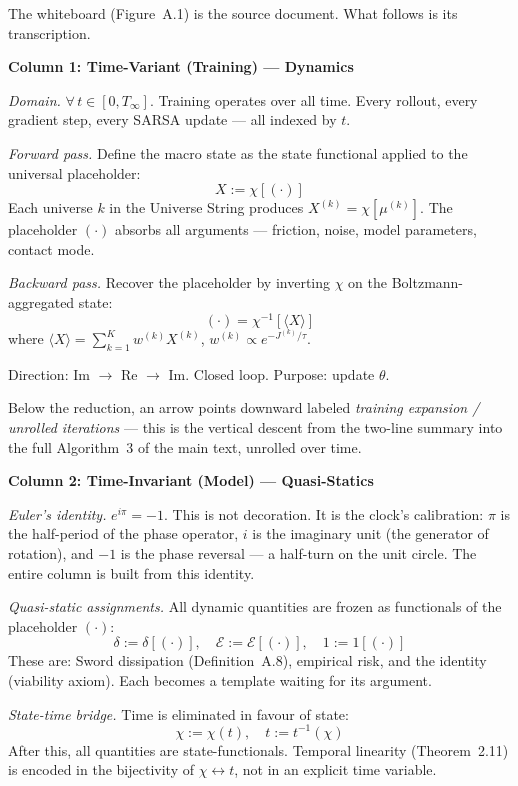 \documentclass[11pt,a4paper]{article}
\theoremstyle{definition}
\theoremstyle{remark}
\begin{document}
The whiteboard (Figure~A.1) is the source document. What follows is its transcription.

\bigskip
\noindent\textbf{Column 1: Time-Variant (Training) --- Dynamics}

\noindent\textit{Domain.} $\forall\, t \in [0, T_\infty]$. Training operates over all time. Every rollout, every gradient step, every SARSA update --- all indexed by $t$.

\noindent\textit{Forward pass.} Define the macro state as the state functional applied to the universal placeholder:
\[
  X := \chi[(\cdot)]
\]
Each universe $k$ in the Universe String produces $X^{(k)} = \chi[\mu^{(k)}]$. The placeholder $(\cdot)$ absorbs all arguments --- friction, noise, model parameters, contact mode.

\noindent\textit{Backward pass.} Recover the placeholder by inverting $\chi$ on the Boltzmann-aggregated state:
\[
  (\cdot) = \chi^{-1}[\langle X \rangle]
\]
where $\langle X \rangle = \sum_{k=1}^K w^{(k)} X^{(k)}$, $w^{(k)} \propto e^{-J^{(k)}/\tau}$.

Direction: Im $\to$ Re $\to$ Im. Closed loop. Purpose: update $\theta$.

Below the reduction, an arrow points downward labeled \emph{training expansion / unrolled iterations} --- this is the vertical descent from the two-line summary into the full Algorithm~3 of the main text, unrolled over time.

\bigskip
\noindent\textbf{Column 2: Time-Invariant (Model) --- Quasi-Statics}

\noindent\textit{Euler's identity.} $e^{i\pi} = -1$. This is not decoration. It is the clock's calibration: $\pi$ is the half-period of the phase operator, $i$ is the imaginary unit (the generator of rotation), and $-1$ is the phase reversal --- a half-turn on the unit circle. The entire column is built from this identity.

\noindent\textit{Quasi-static assignments.} All dynamic quantities are frozen as functionals of the placeholder $(\cdot)$:
\[
  \delta := \delta[(\cdot)], \quad \mathcal{E} := \mathcal{E}[(\cdot)], \quad 1 := 1[(\cdot)]
\]
These are: Sword dissipation (Definition~A.8), empirical risk, and the identity (viability axiom). Each becomes a template waiting for its argument.

\noindent\textit{State-time bridge.} Time is eliminated in favour of state:
\[
  \chi := \chi(t), \quad t := t^{-1}(\chi)
\]
After this, all quantities are state-functionals. Temporal linearity (Theorem~2.11) is encoded in the bijectivity of $\chi \leftrightarrow t$, not in an explicit time variable.
\end{document}
